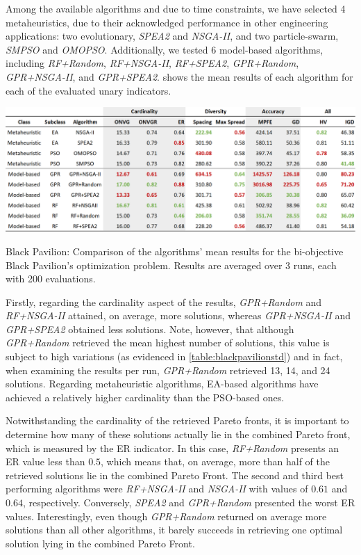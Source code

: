 Among the available algorithms and due to time constraints, we have selected 4 metaheuristics, due to their acknowledged performance in other engineering applications: two evolutionary, \textit{\ac{SPEA2}} and \textit{\ac{NSGA-II}}, and two particle-swarm, \textit{SMPSO} and \textit{OMOPSO}. Additionally, we tested 6 model-based algorithms, including \textit{RF+Random}, \textit{RF+NSGA-II}, \textit{RF+SPEA2}, \textit{GPR+Random}, \textit{GPR+NSGA-II}, and \textit{GPR+SPEA2}.  shows the mean results of each algorithm for each of the evaluated unary indicators. 

\begin{table}[htbp]
	\centering
	\includegraphics[width=\textwidth]{Images/Evaluation/BlackPavilion/Results_Mean_20190416.PNG}
	\caption[Black Pavilion: Mean performance values of the algorithms' results]{Black Pavilion: Comparison of the algorithms' mean results for the bi-objective Black Pavilion's optimization problem. Results are averaged over 3 runs, each with 200 evaluations.}
	\label{table:blackpavilion}
\end{table}

Firstly, regarding the cardinality aspect of the results, \textit{GPR+Random} and \textit{RF+NSGA-II} attained, on average, more solutions, whereas \textit{GPR+NSGA-II} and \textit{GPR+SPEA2} obtained less solutions. Note, however, that although \textit{GPR+Random} retrieved the mean highest number of solutions, this value is subject to high variations (as evidenced in \cref{table:blackpavilionstd}) and in fact, when examining the results per run, \textit{GPR+Random} retrieved 13, 14, and 24 solutions. Regarding metaheuristic algorithms, \ac{EA}-based algorithms have achieved a relatively higher cardinality than the \ac{PSO}-based ones. 

Notwithstanding the cardinality of the retrieved Pareto fronts, it is important to determine how many of these solutions actually lie in the combined Pareto front, which is measured by the \ac{ER} indicator. In this case, \textit{RF+Random} presents an \ac{ER} value less than $0.5$, which means that, on average, more than half of the retrieved solutions lie in the combined Pareto Front. The second and third best performing algorithms were \textit{RF+NSGA-II} and \textit{\ac{NSGA-II}} with values of $0.61$ and $0.64$, respectively. Conversely, \textit{\ac{SPEA2}} and \textit{GPR+Random} presented the worst \ac{ER} values. Interestingly, even though \textit{GPR+Random} returned on average more solutions than all other algorithms, it barely succeeds in retrieving one optimal solution lying in the combined Pareto Front.

